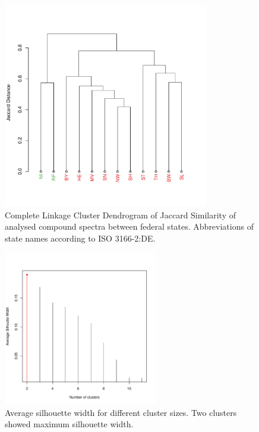 \documentclass[pdftex,a4paper]{scrreprt}
\begin{document}
\begin{figure}[h]
	\centering
	\includegraphics[width = 0.8\textwidth]{varclus}
	\caption[Complete Linkage Cluster Dendrogram of Jaccard Similarity of analysed compound spectra between federal states.]{Complete Linkage Cluster Dendrogram of Jaccard Similarity of analysed compound spectra between federal states. Abbreviations of state names according to ISO 3166-2:DE.}
	\label{fig:varclus}
\end{figure}

\begin{figure}[h]
	\centering
	\includegraphics[width = 0.6\textwidth]{silhouette}
	\caption[Average silhouette width for different cluster sizes.]{Average silhouette width for different cluster sizes. Two clusters showed maximum silhouette width.}
	\label{fig:varclus}
\end{figure}
\end{document}
